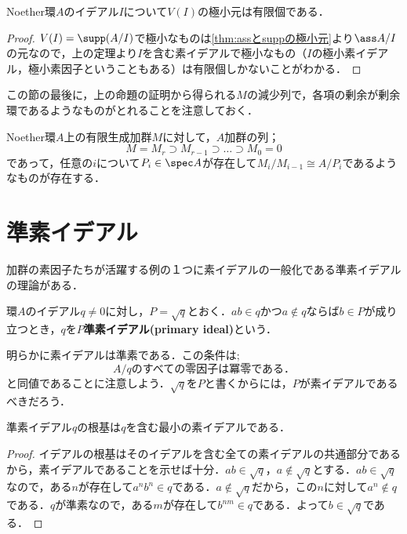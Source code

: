 \begin{cor}\label{cor:Noether環の極小素イデアルは有限個}
	Noether環$A$のイデアル$I$について$V(I)$の極小元は有限個である．
\end{cor}

\begin{proof}
	$V(I)=\supp(A/I)$で極小なものは\ref{thm:assとsuppの極小元}より$\ass A/I$の元なので，上の定理より$I$を含む素イデアルで極小なもの（$I$の極小素イデアル，極小素因子ということもある）は有限個しかないことがわかる．
\end{proof}

この節の最後に，上の命題の証明から得られる$M$の減少列で，各項の剰余が剰余環であるようなものがとれることを注意しておく．
\begin{cor}\label{cor:Assからできる組成列もどき}
	Noether環$A$上の有限生成加群$M$に対して，$A$加群の列；
	\[M=M_r\supset M_{r-1}\supset\dots\supset M_0=0\]
	であって，任意の$i$について$P_i\in\spec A$が存在して$M_i/M_{i-1}\cong A/P_i$であるようなものが存在する．
\end{cor}

\section{準素イデアル}

加群の素因子たちが活躍する例の１つに素イデアルの一般化である準素イデアルの理論がある．

\begin{defi}[準素イデアル]
	環$A$のイデアル$q\neq0$に対し，$P=\sqrt{q}$とおく．$ab\in q$かつ$a\not\in q$ならば$b\in P$が成り立つとき，$q$を$P$\textbf{準素イデアル(primary ideal)}という．
\end{defi}

明らかに素イデアルは準素である．この条件は;
\[A/q\text{のすべての零因子は冪零である．}\]
と同値であることに注意しよう．$\sqrt{q}$を$P$と書くからには，$P$が素イデアルであるべきだろう．

\begin{prop}
	準素イデアル$q$の根基は$q$を含む最小の素イデアルである．
\end{prop}

\begin{proof}
	イデアルの根基はそのイデアルを含む全ての素イデアルの共通部分であるから，素イデアルであることを示せば十分．$ab\in\sqrt{ q}，a\not\in\sqrt{ q}$とする．$ab\in\sqrt{ q}$なので，ある$n$が存在して$a^nb^n\in q$である．$a\not\in\sqrt{ q}$だから，この$n$に対して$a^n\not\in q$である．$ q$が準素なので，ある$m$が存在して$b^{nm}\in q$である．よって$b\in\sqrt{ q}$である．
\end{proof}

